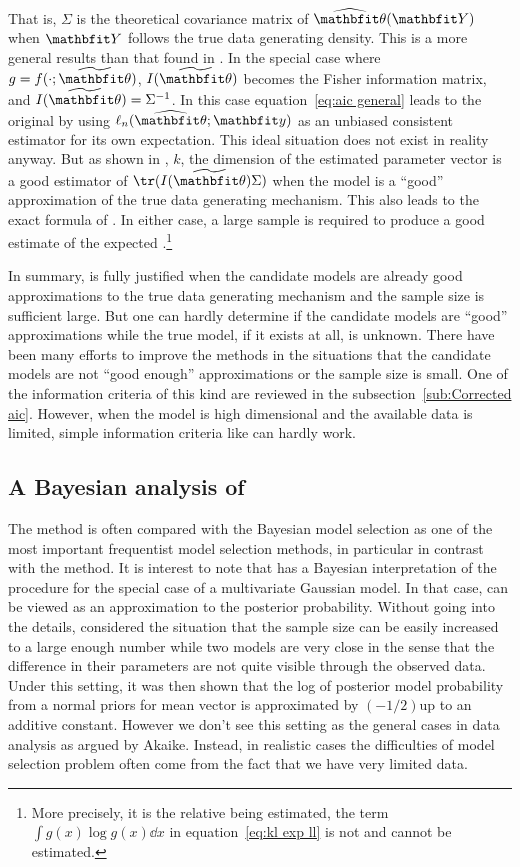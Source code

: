 That is, $\Sigma$ is the theoretical covariance matrix of $\hbth(\bfY)$ when
$\bfY$ follows the true data generating density. This is a more general
results than that found in \textcite{Akaike:1973uc}. In the special case where
$g = f(\cdot;\tbth)$, $I(\tbth)$ becomes the Fisher information matrix, and
$I(\tbth) = \Sigma^{-1}$. In this case equation~\eqref{eq:aic general} leads
to the original \aic by using $\ell_n(\hbth;\bfy)$ as an unbiased consistent
estimator for its own expectation. This ideal situation does not exist in
reality anyway. But as shown in \textcite{Shibata:1989tm}, $k$, the dimension
of the estimated parameter vector is a good estimator of $\tr(I(\tbth)\Sigma)$
when the model is a ``good'' approximation of the true data generating
mechanism. This also leads to the exact formula of \aic. In either case, a
large sample is required to produce a good estimate of the expected
\kl.\footnote{More precisely, it is the relative \kl being estimated, the term
  $\int g(x)\log g(x)\dd x$ in equation~\eqref{eq:kl exp ll} is not and cannot
  be estimated.}

In summary, \aic is fully justified when the candidate models are already good
approximations to the true data generating mechanism and the sample size is
sufficient large. But one can hardly determine if the candidate models are
``good'' approximations while the true model, if it exists at all, is unknown.
There have been many efforts to improve the \aic methods in the situations
that the candidate models are not ``good enough'' approximations or the sample
size is small. One of the information criteria of this kind are reviewed in
the subsection~\ref{sub:Corrected aic}. However, when the model is high
dimensional and the available data is limited, simple information criteria
like \aic can hardly work.

\subsection{A Bayesian analysis of \protect\aic}
\label{sub:A Bayesian analysis of aic}

The \aic method is often compared with the Bayesian model selection as one of
the most important frequentist model selection methods, in particular in
contrast with the \bic method. It is interest to note that
\textcite{Akaike:1978ti} has a Bayesian interpretation of the \aic procedure
for the special case of a multivariate Gaussian model. In that case, \aic can
be viewed as an approximation to the posterior probability. Without going into
the details, \textcite{Akaike:1978ti} considered the situation that the sample
size can be easily increased to a large enough number while two models are
very close in the sense that the difference in their parameters are not quite
visible through the observed data. Under this setting, it was then shown that
the log of posterior model probability from a normal priors for mean vector is
approximated by $(-1/2)$\aic up to an additive constant. However we don't see
this setting as the general cases in data analysis as argued by Akaike.
Instead, in realistic cases the difficulties of model selection problem often
come from the fact that we have very limited data.

